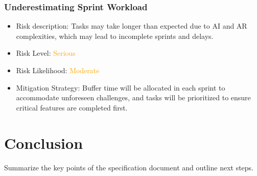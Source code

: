 \documentclass[12pt]{article}
\begin{document}
        \subsubsection{Underestimating Sprint Workload}
        \begin{itemize}
            \item Risk description: Tasks may take longer than expected due to AI and AR complexities, which may lead to incomplete sprints and delays.
            \item Risk Level: \textcolor{orange}{Serious}
            \item Risk Likelihood: \textcolor{orange}{Moderate}
            \item Mitigation Strategy: Buffer time will be allocated in each sprint to accommodate unforeseen challenges, and tasks will be prioritized to ensure critical features are completed first.
        \end{itemize}

\section{Conclusion}
Summarize the key points of the specification document and outline next steps.
\end{document}
